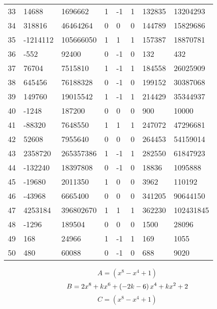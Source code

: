 \documentclass{amsart}
\begin{document}
\begin{longtable}{|l|l|l|lllll|}
33&14688&1696662&1&-1&1&132835&13204293\\
34&318816&46464264&0&0&0&144789&15829686\\
35&-1214112&105666050&1&1&1&157387&18870781\\
36&-552&92400&0&-1&0&132&432\\
37&76704&7515810&1&-1&1&184558&26025909\\
38&645456&76188328&0&-1&0&199152&30387068\\
39&149760&19015542&1&-1&1&214429&35344937\\
40&-1248&187200&0&0&0&900&10000\\
41&-88320&7648550&1&1&1&247072&47296681\\
42&52608&7955640&0&0&0&264453&54159014\\
43&2358720&265357386&1&-1&1&282550&61847923\\
44&-132240&18397808&0&-1&0&18836&1095888\\
45&-19680&2011350&1&0&0&3962&110192\\
46&-43968&6665400&0&0&0&341205&90644150\\
47&4253184&396802670&1&1&1&362230&102431845\\
48&-1296&189504&0&0&0&1500&28096\\
49&168&24966&1&-1&1&169&1055\\
50&480&60088&0&-1&0&688&9020\\
\hline
\end{longtable}
$$A=(x^8
 - x^4
 + 1)$$
$$B=2\*x^8
 + k\*x^6
 + \left(-2\*k
 - 6\right) \*x^4
 + k\*x^2
 + 2$$
$$C=(x^8
 - x^4
 + 1)$$
\end{document}
